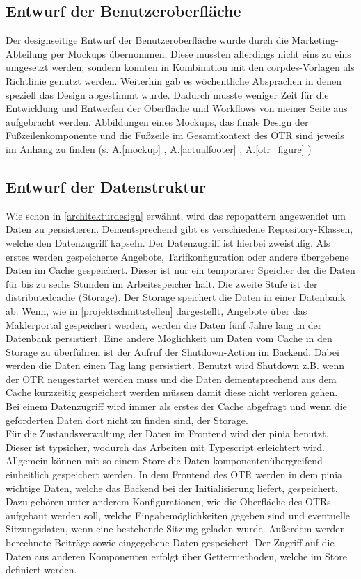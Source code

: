 \subsection{Entwurf der Benutzeroberfläche}
\label{benutzeroberfläche}
Der designseitige Entwurf der Benutzeroberfläche wurde durch die Marketing-Abteilung per Mockups übernommen. Diese mussten allerdings nicht eins zu eins umgesetzt werden, sondern konnten in Kombination mit den \gls{corpdes}-Vorlagen als Richtlinie genutzt werden. Weiterhin gab es wöchentliche Absprachen in denen speziell das Design abgestimmt wurde. Dadurch musste weniger Zeit für die Entwicklung und Entwerfen der Oberfläche und Workflows von meiner Seite aus aufgebracht werden. Abbildungen eines Mockups, das finale Design der Fußzeilenkomponente und die Fußzeile im Gesamtkontext des \ac{OTR} sind jeweils im Anhang zu finden (s. A.\ref{mockup} , A.\ref{actualfooter} , A.\ref{otr_figure} )
\subsection{Entwurf der Datenstruktur}
\label{datenmodell}
Wie schon in \ref{architekturdesign}  erwähnt, wird das \gls{repopattern} angewendet um Daten zu persistieren. Dementsprechend gibt es verschiedene Repository-Klassen, welche den Datenzugriff kapseln. Der Datenzugriff ist hierbei zweistufig. Als erstes werden gespeicherte Angebote, Tarifkonfiguration oder andere übergebene Daten im Cache gespeichert. Dieser ist nur ein temporärer Speicher der die Daten für bis zu sechs Stunden im Arbeitsspeicher hält. Die zweite Stufe ist der \gls{distributedcache} (Storage). Der Storage speichert die Daten in einer Datenbank ab.
Wenn, wie in \ref{projektschnittstellen}  dargestellt, Angebote über das Maklerportal gespeichert werden, werden die Daten fünf Jahre lang in der Datenbank persistiert. Eine andere Möglichkeit um Daten vom Cache in den Storage zu überführen ist der Aufruf der Shutdown-Action im Backend. Dabei werden die Daten einen Tag lang persistiert. Benutzt wird Shutdown z.B. wenn der \ac{OTR} neugestartet werden muss und die Daten dementsprechend aus dem Cache kurzzeitig gespeichert werden müssen damit diese nicht verloren gehen.\\
Bei einem Datenzugriff wird immer als erstes der Cache abgefragt und wenn die geforderten Daten dort nicht zu finden sind, der Storage.\\
Für die Zustandsverwaltung der Daten im Frontend wird der \gls{pinia} benutzt. Dieser ist typsicher, wodurch das Arbeiten mit Typescript erleichtert wird. Allgemein können mit so einem Store die Daten komponentenübergreifend einheitlich gespeichert werden. In dem Frontend des \ac{OTR} werden in dem \gls{pinia} wichtige Daten, welche das Backend bei der Initialisierung liefert, gespeichert. Dazu gehören unter anderem Konfigurationen, wie die Oberfläche des \ac{OTR}s aufgebaut werden soll, welche Eingabemöglichkeiten gegeben sind und eventuelle Sitzungsdaten, wenn eine bestehende Sitzung geladen wurde. Außerdem werden berechnete Beiträge sowie eingegebene Daten gespeichert. Der Zugriff auf die Daten aus anderen Komponenten erfolgt über Gettermethoden, welche im Store definiert werden.
